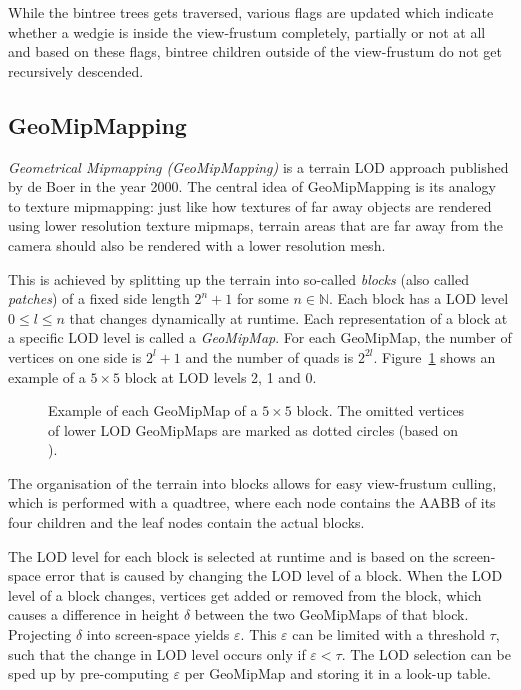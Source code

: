 While the bintree trees gets traversed, various flags are updated which indicate whether a wedgie is inside the view-frustum completely, partially or not at all
and based on these flags, bintree children outside of the view-frustum do not get recursively descended.


\subsection{GeoMipMapping}
\textit{Geometrical Mipmapping (GeoMipMapping)} is a terrain LOD approach published by de Boer \cite{geomipmapping} in the year 2000.
The central idea of GeoMipMapping is its analogy to texture mipmapping: just like how textures of far away objects are rendered using lower resolution texture mipmaps,
terrain areas that are far away from the camera should also be rendered with a lower resolution mesh.

This is achieved by splitting up the terrain into so-called \textit{blocks} (also called \textit{patches}) of a fixed side length $2^n + 1$ for some $n \in \mathbb{N}$.
Each block has a LOD level $0\leq l \leq n$ that changes dynamically at runtime.
Each representation of a block at a specific LOD level is called a \textit{GeoMipMap}.
For each GeoMipMap, the number of vertices on one side is $2^{l}+1$ and the number of quads is $2^{2l}$.
Figure~\ref{fig:geomipmapping-patch-example} shows an example of a $5 \times 5$ block at LOD levels 2, 1 and 0.

\begin{figure}[H]
  \centering
  \qquad
  \qquad
  \caption{Example of each GeoMipMap of a $5 \times 5$ block. The omitted vertices of lower LOD GeoMipMaps are marked as dotted circles (based on \cite{geomipmapping}).}\label{fig:geomipmapping-patch-example}
\end{figure}

The organisation of the terrain into blocks allows for easy view-frustum culling, which is performed 
with a quadtree, where each node contains the AABB of its four children and the leaf nodes 
contain the actual blocks.

The LOD level for each block is selected at runtime and is based on the 
screen-space error that is caused by changing the LOD level of a block.
When the LOD level of a block changes, vertices get added or removed from the block,
which causes a difference in height $\delta$ between the two GeoMipMaps of that block. Projecting $\delta$ into 
screen-space yields $\varepsilon$. 
This $\varepsilon$ can be limited with a threshold $\tau$, such that 
the change in LOD level occurs only if $\varepsilon < \tau$.
The LOD selection can be sped up by pre-computing $\varepsilon$ per GeoMipMap and storing it in a look-up table.

